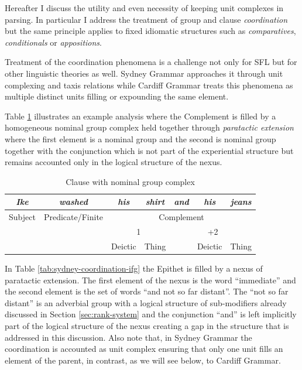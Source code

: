 Hereafter I discuss the utility and even necessity of keeping unit complexes in parsing. In particular I address the treatment of group and clause \textit{coordination} but the same
principle applies to fixed idiomatic structures such as \textit{comparatives}, \textit{conditionals} or \textit{appositions}.

Treatment of the coordination phenomena is a challenge not only for SFL but for other linguistic theories as well. Sydney Grammar approaches it through unit complexing and taxis relations while Cardiff Grammar treats this phenomena as multiple distinct units filling or expounding the same element. 


Table \ref{ex:Sydeny-example-analisys} illustrates an example analysis where the Complement is filled by a homogeneous nominal group complex held together through \textit{paratactic extension} where the first element is a nominal group and the second is nominal group together with the conjunction which is not part of the experiential structure but remains accounted only in the logical structure of the nexus. 

\begin{table}[h]
    \centering
    \begin{tabular}{cc|c|c|c|c|c|}
        \hline
        \multicolumn{1}{|c|}{\textit{Ike}} & \textit{washed} & \textit{his} & \textit{shirt} & \textit{and} & \textit{his} & \textit{jeans} \\ \hline
        \multicolumn{1}{|c|}{Subject} & Predicate/Finite & \multicolumn{5}{c|}{Complement} \\ \hline
        &  & \multicolumn{2}{c|}{1} & \multicolumn{3}{c|}{+2} \\ \cline{3-7} 
        &  & Deictic & Thing &  & Deictic & Thing \\ \cline{3-4} \cline{6-7} 
    \end{tabular}
    \caption{Clause with nominal group complex}
    \label{ex:Sydeny-example-analisys}
\end{table}

In Table \ref{tab:sydney-coordination-ifg} the Epithet is filled by a nexus of paratactic extension. The first element of the nexus is the word ``immediate'' and the second element is the set of words ``and not so far distant''. The ``not so far distant'' is an adverbial group with a logical structure of sub-modifiers already discussed in Section \ref{sec:rank-system} and the conjunction ``and'' is left implicitly part of the logical structure of the nexus creating a gap in the structure that is addressed in this discussion. Also note that, in Sydney Grammar the coordination is accounted as unit complex ensuring that only one unit fills an element of the parent, in contrast, as we will see below, to Cardiff Grammar. 

